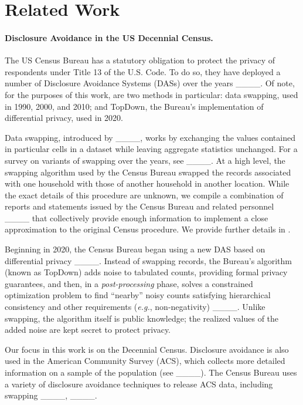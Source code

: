 \section{Related Work}
\label{sec:related}
\paragraph*{Disclosure Avoidance in the US Decennial Census.}

The US Census Bureau has a statutory obligation to protect the privacy of respondents under Title 13 of the U.S. Code.
To do so, they have deployed a number of Disclosure Avoidance Systems (DASs) over the years ____.
Of note, for the purposes of this work, are two methods in particular: data swapping, used in 1990, 2000, and 2010; and TopDown, the Bureau's implementation of differential privacy, used in 2020.

Data swapping, introduced by ____, works by exchanging the values contained in particular cells in a dataset while leaving aggregate statistics unchanged.
For a survey on variants of swapping over the years, see ____.
At a high level, the swapping algorithm used by the Census Bureau swapped the records associated with one household with those of another household in another location.
While the exact details of this procedure are unknown, we compile a combination of reports and statements issued by the Census Bureau and related personnel ____ that collectively provide enough information to implement a close approximation to the original Census procedure.
We provide further details in .

Beginning in 2020, the Census Bureau began using a new DAS based on differential privacy ____.
Instead of swapping records, the Bureau's algorithm (known as TopDown) adds noise to tabulated counts, providing formal privacy guarantees, and then, in a {\em post-processing} phase, solves a constrained optimization problem to find ``nearby'' noisy counts satisfying hierarchical consistency and other requirements (\textit{e.g.}, non-negativity) ____. 
Unlike swapping, the algorithm itself is public knowledge; the realized values of the added noise are kept secret to protect privacy.

Our focus in this work is on the Decennial Census.
Disclosure avoidance is also used in the American Community Survey (ACS), which collects more detailed information on a sample of the population (see ____).
The Census Bureau uses a variety of disclosure avoidance techniques to release
ACS data, including swapping ____, ____.


